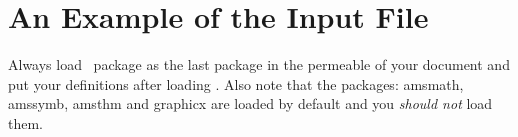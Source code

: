 \section{An Example of the Input File}

\begin{Warning}
Always load \XePersian\ package as the last package in the permeable of your document and put your definitions after loading \XePersian . Also note that the packages: \textsf{amsmath}, \textsf{amssymb}, \textsf{amsthm} and \textsf{graphicx} are loaded by default and you \emph{should not} load them.
\end{Warning}

